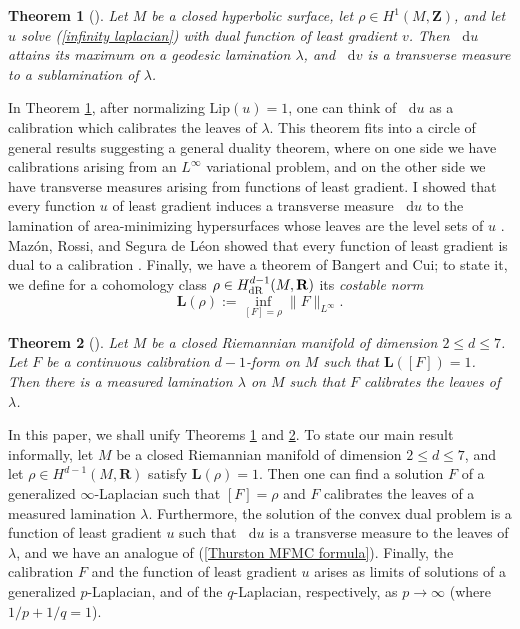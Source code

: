 \documentclass[reqno,11pt]{amsart}
\newcommand{\ZZ}{\mathbf{Z}}
\newcommand{\RR}{\mathbf{R}}
\newcommand*\dif{\mathop{}\!\mathrm{d}}
\newcommand{\Lip}{\mathrm{Lip}}
\newcommand{\Comass}{\mathbf L}
\newcommand{\dfn}[1]{\emph{#1}\index{#1}}
\newtheorem{theorem}{Theorem}[section]
\theoremstyle{definition}
\numberwithin{equation}{section}
\begin{document}
\begin{theorem}[{\cite{daskalopoulos2020transverse}}]\label{Daskalopolous MFMC}
Let $M$ be a closed hyperbolic surface, let $\rho \in H^1(M, \ZZ)$, and let $u$ solve (\ref{infinity laplacian}) with dual function of least gradient $v$.
Then $\dif u$ attains its maximum on a geodesic lamination $\lambda$, and $\dif v$ is a transverse measure to a sublamination of $\lambda$.
\end{theorem}

In Theorem \ref{Daskalopolous MFMC}, after normalizing $\Lip(u) = 1$, one can think of $\dif u$ as a calibration which calibrates the leaves of $\lambda$.
This theorem fits into a circle of general results suggesting a general duality theorem, where on one side we have calibrations arising from an $L^\infty$ variational problem, and on the other side we have transverse measures arising from functions of least gradient.
I showed that every function $u$ of least gradient induces a transverse measure $\dif u$ to the lamination of area-minimizing hypersurfaces whose leaves are the level sets of $u$ \cite{BackusCML}.
Maz\'on, Rossi, and Segura de L\'eon showed that every function of least gradient is dual to a calibration \cite{Mazon14}.
Finally, we have a theorem of Bangert and Cui; to state it, we define for a cohomology class $\rho \in H^{d - 1}_{\rm dR}(M, \RR)$ its \dfn{costable norm}
$$\Comass(\rho) := \inf_{[F] = \rho} \|F\|_{L^\infty}.$$

\begin{theorem}[{\cite{bangert_cui_2017}}]\label{Bangert MFMC}
Let $M$ be a closed Riemannian manifold of dimension $2 \leq d \leq 7$.
Let $F$ be a continuous calibration $d - 1$-form on $M$ such that $\Comass([F]) = 1$.
Then there is a measured lamination $\lambda$ on $M$ such that $F$ calibrates the leaves of $\lambda$.
\end{theorem}

In this paper, we shall unify Theorems \ref{Daskalopolous MFMC} and \ref{Bangert MFMC}.
To state our main result informally, let $M$ be a closed Riemannian manifold of dimension $2 \leq d \leq 7$, and let $\rho \in H^{d - 1}(M, \RR)$ satisfy $\Comass(\rho) = 1$.
Then one can find a solution $F$ of a generalized $\infty$-Laplacian such that $[F] = \rho$ and $F$ calibrates the leaves of a measured lamination $\lambda$.
Furthermore, the solution of the convex dual problem is a function of least gradient $u$ such that $\dif u$ is a transverse measure to the leaves of $\lambda$, and we have an analogue of (\ref{Thurston MFMC formula}).
Finally, the calibration $F$ and the function of least gradient $u$ arises as limits of solutions of a generalized $p$-Laplacian, and of the $q$-Laplacian, respectively, as $p \to \infty$ (where $1/p + 1/q = 1$).
\end{document}
